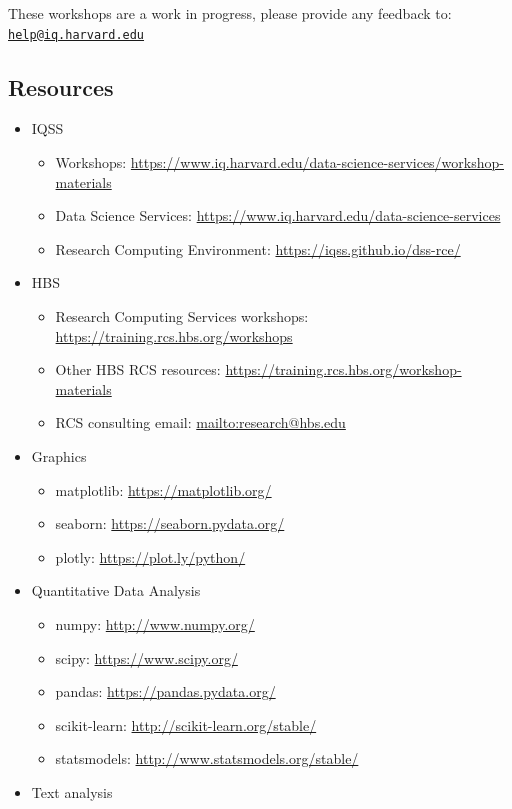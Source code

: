 \documentclass[
]{book}
\providecommand{\tightlist}{%
  \setlength{\itemsep}{0pt}\setlength{\parskip}{0pt}}
\begin{document}
These workshops are a work in progress, please provide any feedback to: \href{mailto:help@iq.harvard.edu}{\nolinkurl{help@iq.harvard.edu}}

\hypertarget{resources-7}{%
\subsection{Resources}\label{resources-7}}

\begin{itemize}
\tightlist
\item
  IQSS

  \begin{itemize}
  \tightlist
  \item
    Workshops: \url{https://www.iq.harvard.edu/data-science-services/workshop-materials}
  \item
    Data Science Services: \url{https://www.iq.harvard.edu/data-science-services}
  \item
    Research Computing Environment: \url{https://iqss.github.io/dss-rce/}
  \end{itemize}
\item
  HBS

  \begin{itemize}
  \tightlist
  \item
    Research Computing Services workshops: \url{https://training.rcs.hbs.org/workshops}
  \item
    Other HBS RCS resources: \url{https://training.rcs.hbs.org/workshop-materials}
  \item
    RCS consulting email: \url{mailto:research@hbs.edu}
  \end{itemize}
\item
  Graphics

  \begin{itemize}
  \tightlist
  \item
    matplotlib: \url{https://matplotlib.org/}
  \item
    seaborn: \url{https://seaborn.pydata.org/}
  \item
    plotly: \url{https://plot.ly/python/}
  \end{itemize}
\item
  Quantitative Data Analysis

  \begin{itemize}
  \tightlist
  \item
    numpy: \url{http://www.numpy.org/}
  \item
    scipy: \url{https://www.scipy.org/}
  \item
    pandas: \url{https://pandas.pydata.org/}
  \item
    scikit-learn: \url{http://scikit-learn.org/stable/}
  \item
    statsmodels: \url{http://www.statsmodels.org/stable/}
  \end{itemize}
\item
  Text analysis


\end{itemize}
\end{document}
